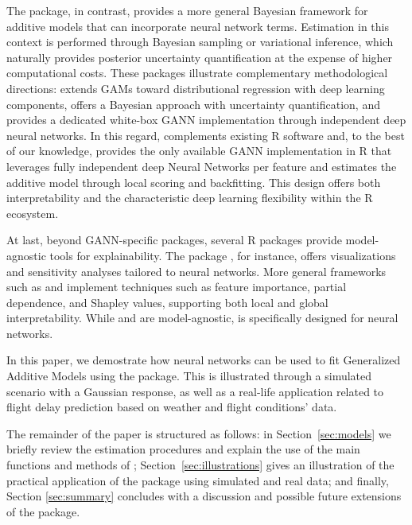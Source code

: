 The  package\citep{bamlss}, in contrast, provides a more general Bayesian framework for additive models that can incorporate neural network terms. Estimation in this context is performed through Bayesian sampling or variational inference, which naturally provides posterior uncertainty quantification at the expense of higher computational costs. These packages illustrate complementary methodological directions:  extends GAMs toward distributional regression with deep learning components,  offers a Bayesian approach with uncertainty quantification, and  provides a dedicated white-box GANN implementation through independent deep neural networks. In this regard,  complements existing \textsf{R} software and, to the best of our knowledge, provides the only available GANN implementation in \textsf{R} that leverages fully independent deep Neural Networks per feature and estimates the additive model through local scoring and backfitting. This design offers both interpretability and the characteristic deep learning flexibility within the \textsf{R} ecosystem.

At last, beyond GANN-specific packages, several \textsf{R} packages provide model-agnostic tools for explainability. The  package \citep{beck2018neuralnettools}, for instance, offers visualizations and sensitivity analyses tailored to neural networks. More general frameworks such as  \citep{iml} and  \citep{dalex} implement techniques such as feature importance, partial dependence, and Shapley values, supporting both local and global interpretability. While  and  are model-agnostic,  is specifically designed for neural networks.

In this paper, we demostrate how neural networks can be used to fit Generalized Additive Models using the  package. This is illustrated through a simulated scenario with a Gaussian response, as well as a real-life application related to flight delay prediction based on weather and flight conditions' data. 

The remainder of the paper is structured as follows: in Section~\ref{sec:models} we briefly review the estimation procedures and explain the use of the main functions and methods of ; Section~\ref{sec:illustrations} gives an illustration of the practical application of the package using simulated and real data; and finally, Section \ref{sec:summary} concludes with a discussion and possible future extensions of the package. 

